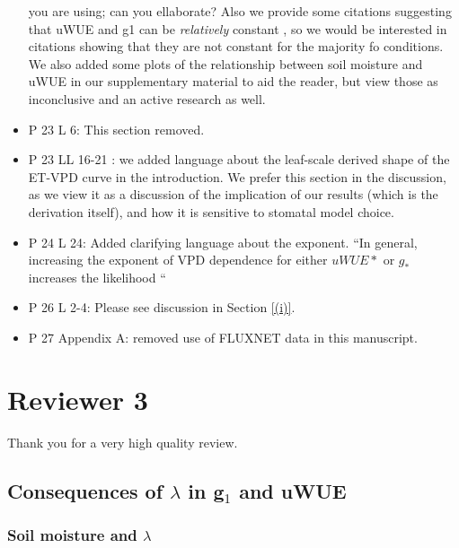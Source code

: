 \documentclass[12pt]{article}
\begin{document}
\begin{itemize}
  you are using; can you ellaborate? Also we provide some citations
  suggesting that uWUE and g1 can be \textit{relatively} constant
  \citep{Lin_2005, Franks_2017, Zhou_2015}, so we would be interested
  in citations showing that they are not constant for the majority fo
  conditions. We also added some plots of the relationship between
  soil moisture and uWUE in our supplementary material to aid the
  reader, but view those as inconclusive and an active research as
  well.
\item P 23 L 6: This section removed.
\item P 23 LL 16-21 : we added language about the leaf-scale derived
  shape of the ET-VPD curve in the introduction. We prefer this
  section in the discussion, as we view it as a discussion of the
  implication of our results (which is the derivation itself), and how
  it is sensitive to stomatal model choice.
\item P 24 L 24: Added clarifying language about the exponent.
  ``In general, increasing the exponent of VPD dependence for
  either $uWUE*$ or $g_*$ increases the likelihood ``
\item P 26 L 2-4: Please see discussion in Section \ref{(i)}.
\item P 27 Appendix A: removed use of FLUXNET data in this manuscript.
\end{itemize}

\section{Reviewer 3}

Thank you for a very high quality review.

\subsection{Consequences of $\lambda$ in g$_1$ and uWUE}

\subsubsection{Soil moisture and $\lambda$}
\end{document}
